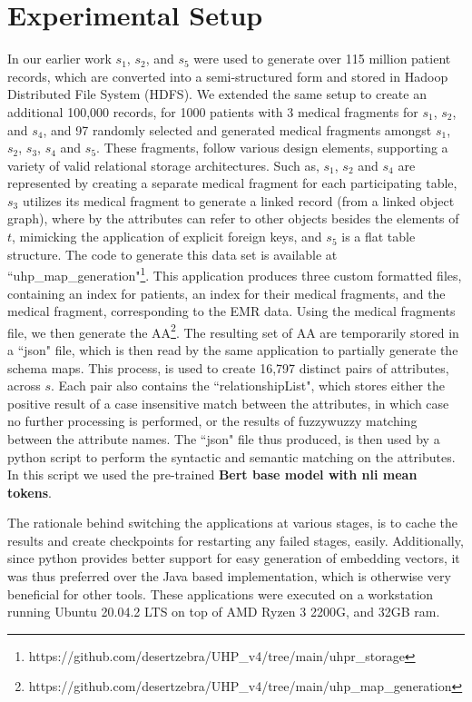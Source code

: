 
\section*{Experimental Setup}
\label{experimentalSetup}
In our earlier work \cite{Satti2020} $s_1$, $s_2$, and $s_5$ were used to generate over 115 million patient records, which are converted into a semi-structured form and stored in Hadoop Distributed File System (HDFS). We extended the same setup to create an additional 100,000 records, for 1000 patients with 3 medical fragments for $s_1$, $s_2$, and $s_4$, and 97 randomly selected and generated medical fragments amongst $s_1$, $s_2$, $s_3$, $s_4$ and $s_5$. These fragments, follow various design elements, supporting a variety of valid relational storage architectures. Such as, $s_1$, $s_2$ and $s_4$ are represented by creating a separate medical fragment for each participating table, $s_3$ utilizes its medical fragment to generate a linked record (from a linked object graph), where by the attributes can refer to other objects besides the elements of $t$, mimicking the application of explicit foreign keys, and $s_5$ is a flat table structure. The code to generate this data set is available at ``uhp\_map\_generation"\footnote{https://github.com/desertzebra/UHP\_v4/tree/main/uhpr\_storage}. This application produces three custom formatted files, containing an index for patients, an index for their medical fragments, and the medical fragment, corresponding to the EMR data. Using the medical fragments file, we then generate the AA\footnote{https://github.com/desertzebra/UHP\_v4/tree/main/uhp\_map\_generation}. The resulting set of AA are temporarily stored in a ``json" file, which is then read by the same application to partially generate the schema maps. This process, is used to create 16,797  distinct pairs of attributes, across $s$. Each pair also contains the ``relationshipList", which stores either the positive result of a case insensitive match between the attributes, in which case no further processing is performed, or the results of fuzzywuzzy matching between the attribute names. 
The ``json" file thus produced, is then used by a python script to perform the syntactic and semantic matching on the attributes. In this script we used the pre-trained \textbf{Bert base model with nli mean tokens}. 

The rationale behind switching the applications at various stages, is to cache the results and create checkpoints for restarting any failed stages, easily. Additionally, since python provides better support for easy generation of embedding vectors, it was thus preferred over the Java based implementation, which is otherwise very beneficial for other tools. These applications were executed on a workstation running Ubuntu 20.04.2 LTS on top of AMD Ryzen 3 2200G, and 32GB ram.



